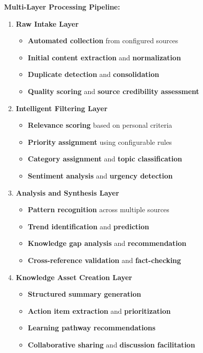 \documentclass[
  letterpaper,
  DIV=11,
  numbers=noendperiod]{scrartcl}
\providecommand{\tightlist}{%
  \setlength{\itemsep}{0pt}\setlength{\parskip}{0pt}}\usepackage{longtable,booktabs,array}
\begin{document}
\textbf{Multi-Layer Processing Pipeline:}

\begin{enumerate}
\def\labelenumi{\arabic{enumi}.}
\tightlist
\item
  \textbf{Raw Intake Layer}

  \begin{itemize}
  \tightlist
  \item
    \textbf{Automated collection} from configured sources
  \item
    \textbf{Initial content extraction} and \textbf{normalization}
  \item
    \textbf{Duplicate detection} and \textbf{consolidation}
  \item
    \textbf{Quality scoring} and \textbf{source credibility assessment}
  \end{itemize}
\item
  \textbf{Intelligent Filtering Layer}

  \begin{itemize}
  \tightlist
  \item
    \textbf{Relevance scoring} based on personal criteria
  \item
    \textbf{Priority assignment} using configurable rules
  \item
    \textbf{Category assignment} and \textbf{topic classification}
  \item
    \textbf{Sentiment analysis} and \textbf{urgency detection}
  \end{itemize}
\item
  \textbf{Analysis and Synthesis Layer}

  \begin{itemize}
  \tightlist
  \item
    \textbf{Pattern recognition} across multiple sources
  \item
    \textbf{Trend identification} and \textbf{prediction}
  \item
    \textbf{Knowledge gap analysis} and \textbf{recommendation}
  \item
    \textbf{Cross-reference validation} and \textbf{fact-checking}
  \end{itemize}
\item
  \textbf{Knowledge Asset Creation Layer}

  \begin{itemize}
  \tightlist
  \item
    \textbf{Structured summary generation}
  \item
    \textbf{Action item extraction} and \textbf{prioritization}
  \item
    \textbf{Learning pathway recommendations}
  \item
    \textbf{Collaborative sharing} and \textbf{discussion facilitation}
  \end{itemize}
\end{enumerate}
\end{document}
